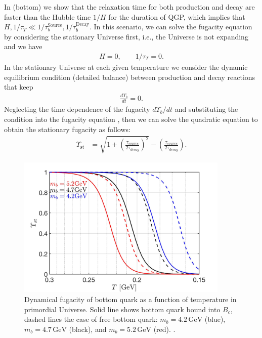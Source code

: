 In  (bottom) we show that the relaxation time for both production and decay are faster than the Hubble time $1/H$ for the duration of QGP, which implies that $H,1/\tau_T\ll1/\tau_{b}^{\mathrm{Source}},1/\tau^{\mathrm{Decay}}_b$. In this scenario, we can solve the fugacity equation by considering the stationary Universe first, i.e., the Universe is not expanding and we have
\begin{align}\label{stationary}
H=0,\qquad 1/\tau_T=0.
\end{align} 
In the stationary Universe at each given temperature we consider the dynamic equilibrium condition (detailed balance) between production and decay reactions that keep
\begin{align}
\frac{d\Upsilon_b}{dt}=0.
\end{align}
Neglecting the time dependence of the fugacity $d\Upsilon_b/dt$ and substituting the condition   into the fugacity equation , then we can solve the quadratic equation to obtain the stationary fugacity as follows: %
\begin{align}
\label{Fugacity_Sol}
\Upsilon_{\mathrm{st}}&=\sqrt{1+\left(\frac{\tau_{source}}{2\tau_{decay}}\right)^2}-\left(\frac{\tau_{source}}{2\tau_{decay}}\right).
\end{align} 

\begin{figure} 
\centerline{\includegraphics[width=0.9\textwidth]{./plots/BquarkFugacity_tot}}
\caption{Dynamical fugacity of bottom quark as a function of temperature in primordial Universe. Solid line shows bottom quark bound into $B_c$, dashed lines the case of free bottom quark: $m_b=4.2\,\mathrm{GeV}$ (blue), $m_b=4.7\,\mathrm{GeV}$ (black), and $m_b=5.2\,\mathrm{GeV}$ (red). . }
\label{fugacity_bc}
\end{figure}

